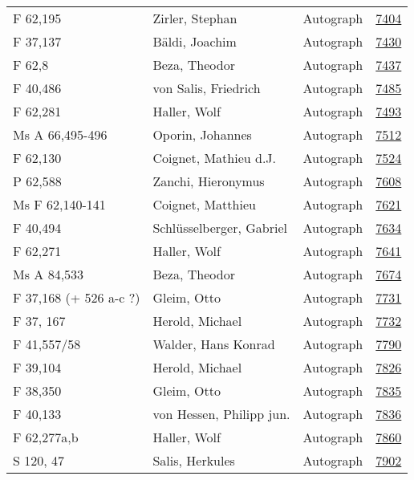 \documentclass[10pt,a4paper,landscape]{report}
\begin{document}
\begin{longtable}{p{16cm}p{4cm}lr}
F 62,195	&	Zirler, Stephan	&	Autograph	&	\href{http://130.60.24.72/assignment/7404}{7404}\\
F 37,137	&	Bäldi, Joachim	&	Autograph	&	\href{http://130.60.24.72/assignment/7430}{7430}\\
F 62,8	&	Beza, Theodor	&	Autograph	&	\href{http://130.60.24.72/assignment/7437}{7437}\\
F 40,486	&	von Salis, Friedrich	&	Autograph	&	\href{http://130.60.24.72/assignment/7485}{7485}\\
F 62,281	&	Haller, Wolf	&	Autograph	&	\href{http://130.60.24.72/assignment/7493}{7493}\\
Ms A 66,495-496	&	Oporin, Johannes	&	Autograph	&	\href{http://130.60.24.72/assignment/7512}{7512}\\
F 62,130	&	Coignet, Mathieu d.J.	&	Autograph	&	\href{http://130.60.24.72/assignment/7524}{7524}\\
P 62,588	&	Zanchi, Hieronymus	&	Autograph	&	\href{http://130.60.24.72/assignment/7608}{7608}\\
Ms F 62,140-141	&	Coignet, Matthieu	&	Autograph	&	\href{http://130.60.24.72/assignment/7621}{7621}\\
F 40,494	&	Schlüsselberger, Gabriel	&	Autograph	&	\href{http://130.60.24.72/assignment/7634}{7634}\\
F 62,271	&	Haller, Wolf	&	Autograph	&	\href{http://130.60.24.72/assignment/7641}{7641}\\
Ms A 84,533	&	Beza, Theodor	&	Autograph	&	\href{http://130.60.24.72/assignment/7674}{7674}\\
F 37,168 (+ 526 a-c ?)	&	Gleim, Otto	&	Autograph	&	\href{http://130.60.24.72/assignment/7731}{7731}\\
F 37, 167	&	Herold, Michael	&	Autograph	&	\href{http://130.60.24.72/assignment/7732}{7732}\\
F 41,557/58	&	Walder, Hans Konrad	&	Autograph	&	\href{http://130.60.24.72/assignment/7790}{7790}\\
F 39,104	&	Herold, Michael	&	Autograph	&	\href{http://130.60.24.72/assignment/7826}{7826}\\
F 38,350	&	Gleim, Otto	&	Autograph	&	\href{http://130.60.24.72/assignment/7835}{7835}\\
F 40,133	&	von Hessen, Philipp jun.	&	Autograph	&	\href{http://130.60.24.72/assignment/7836}{7836}\\
F 62,277a,b	&	Haller, Wolf	&	Autograph	&	\href{http://130.60.24.72/assignment/7860}{7860}\\
S 120, 47	&	Salis, Herkules	&	Autograph	&	\href{http://130.60.24.72/assignment/7902}{7902}\\

\end{longtable}
\end{document}
